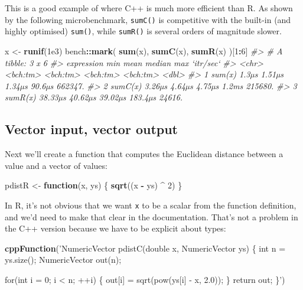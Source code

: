 \documentclass[]{book}
\newenvironment{Shaded}{\begin{snugshade}}{\end{snugshade}}
\newcommand{\CommentTok}[1]{\textcolor[rgb]{0.37,0.37,0.37}{\textit{#1}}}
\newcommand{\ControlFlowTok}[1]{\textcolor[rgb]{0.27,0.27,0.27}{\textbf{#1}}}
\newcommand{\DecValTok}[1]{\textcolor[rgb]{0.06,0.06,0.06}{#1}}
\newcommand{\FloatTok}[1]{\textcolor[rgb]{0.06,0.06,0.06}{#1}}
\newcommand{\KeywordTok}[1]{\textcolor[rgb]{0.27,0.27,0.27}{\textbf{#1}}}
\newcommand{\NormalTok}[1]{#1}
\newcommand{\OperatorTok}[1]{\textcolor[rgb]{0.43,0.43,0.43}{\textbf{#1}}}
\newcommand{\StringTok}[1]{\textcolor[rgb]{0.5,0.5,0.5}{#1}}
\begin{document}
This is a good example of where C++ is much more efficient than R. As shown by the following microbenchmark, \texttt{sumC()} is competitive with the built-in (and highly optimised) \texttt{sum()}, while \texttt{sumR()} is several orders of magnitude slower.

\begin{Shaded}
\begin{Highlighting}[]
\NormalTok{x <-}\StringTok{ }\KeywordTok{runif}\NormalTok{(}\FloatTok{1e3}\NormalTok{)}
\NormalTok{bench}\OperatorTok{::}\KeywordTok{mark}\NormalTok{(}
  \KeywordTok{sum}\NormalTok{(x),}
  \KeywordTok{sumC}\NormalTok{(x),}
  \KeywordTok{sumR}\NormalTok{(x)}
\NormalTok{)[}\DecValTok{1}\OperatorTok{:}\DecValTok{6}\NormalTok{]}
\CommentTok{#> # A tibble: 3 x 6}
\CommentTok{#>   expression      min     mean   median      max `itr/sec`}
\CommentTok{#>   <chr>      <bch:tm> <bch:tm> <bch:tm> <bch:tm>     <dbl>}
\CommentTok{#> 1 sum(x)        1.3µs   1.51µs   1.34µs   90.6µs   662347.}
\CommentTok{#> 2 sumC(x)      3.26µs   4.64µs   4.75µs    1.2ms   215680.}
\CommentTok{#> 3 sumR(x)     38.33µs  40.62µs  39.02µs  183.4µs    24616.}
\end{Highlighting}
\end{Shaded}

\hypertarget{vector-input-vector-output}{%
\subsection{Vector input, vector output}\label{vector-input-vector-output}}

Next we'll create a function that computes the Euclidean distance between a value and a vector of values:

\begin{Shaded}
\begin{Highlighting}[]
\NormalTok{pdistR <-}\StringTok{ }\ControlFlowTok{function}\NormalTok{(x, ys) \{}
  \KeywordTok{sqrt}\NormalTok{((x }\OperatorTok{-}\StringTok{ }\NormalTok{ys) }\OperatorTok{^}\StringTok{ }\DecValTok{2}\NormalTok{)}
\NormalTok{\}}
\end{Highlighting}
\end{Shaded}

In R, it's not obvious that we want \texttt{x} to be a scalar from the function definition, and we'd need to make that clear in the documentation. That's not a problem in the C++ version because we have to be explicit about types:

\begin{Shaded}
\begin{Highlighting}[]
\KeywordTok{cppFunction}\NormalTok{(}\StringTok{'NumericVector pdistC(double x, NumericVector ys) \{}
\StringTok{  int n = ys.size();}
\StringTok{  NumericVector out(n);}

\StringTok{  for(int i = 0; i < n; ++i) \{}
\StringTok{    out[i] = sqrt(pow(ys[i] - x, 2.0));}
\StringTok{  \}}
\StringTok{  return out;}
\StringTok{\}'}\NormalTok{)}
\end{Highlighting}
\end{Shaded}
\end{document}
